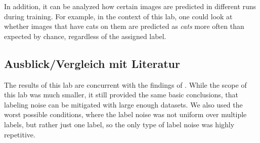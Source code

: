 \documentclass[a4paper,11pt]{scrartcl}
\theoremstyle{definition}
\begin{document}
In addition, it can be analyzed how certain images are predicted in different runs during training. For example, in the context of this lab, one could look at whether images that have cats on them are predicted as \emph{cats} more often than expected by chance, regardless of the assigned label.

\subsection{Ausblick/Vergleich mit Literatur}
The results of this lab are concurrent with the findings of \cite{rolnick_label_noise}. While the scope of this lab was much smaller, it still provided the same basic conclusions, that labeling noise can be mitigated with large enough datasets. We also used the worst possible conditions, where the label noise was not uniform over multiple labels, but rather just one label, so the only type of label noise was highly repetitive.








\end{document}
